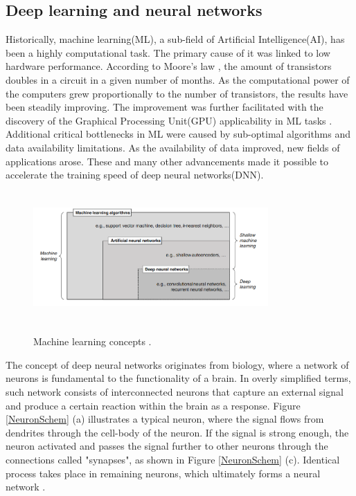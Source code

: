 \documentclass[english, 12pt, a4paper, elec, utf8, a-1b, online]{aaltothesis}
\begin{document}
\subsection{Deep learning and neural networks}
Historically, machine learning(ML), a sub-field of Artificial Intelligence(AI), has been a highly computational task. The primary cause of it was linked to low hardware performance. According to Moore's law \cite{Etiemble2022}, the amount of transistors doubles in a circuit in a given number of months.  As the computational power of the computers grew proportionally to the number of transistors, the results have been steadily improving. The improvement was further facilitated with the discovery of the Graphical Processing Unit(GPU) applicability in ML tasks \cite{Hwang2018}. Additional critical bottlenecks in ML were caused by sub-optimal algorithms and data availability limitations. As the availability of data improved, new fields of applications arose. These and many other advancements made it possible to accelerate the training speed of deep neural networks(DNN).  

\begin{figure}[htb]
	\begin{center}
		\includegraphics[width=0.8\textwidth,height=50mm]{./ml1.png}
	\end{center}
	\caption{Machine learning concepts \cite{Janiesch2021}.}
	\begin{center}
		\label{MLConcepts}
	\end{center}
\end{figure}
\FloatBarrier

The concept of deep neural networks originates from biology, where a network of neurons is fundamental to the functionality of a brain. In overly simplified terms, such network consists of interconnected neurons that capture an external signal and produce a certain reaction within the brain as a response. Figure \ref{NeuronSchem} (a) illustrates a typical neuron, where the signal flows from dendrites through the cell-body of the neuron. If the signal is strong enough, the neuron activated and passes the signal further to other neurons through the connections called "synapses", as shown in Figure \ref{NeuronSchem} (c). Identical process takes place in remaining neurons, which ultimately forms a neural network \cite{Mehlig_2021}.
\end{document}
